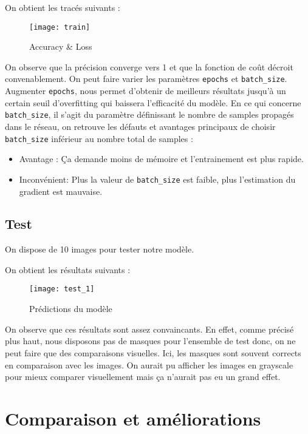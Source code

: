 \documentclass[12pt,a4paper,titlepage]{article}
\begin{document}
On obtient les tracés suivants :

\begin{figure}[H]
    \caption{Accuracy \& Loss}
    \texttt{[image: train]}
    \centering
\end{figure}

On observe que la précision converge vers 1 et que la fonction de coût décroit convenablement.
On peut faire varier les paramètres \texttt{epochs} et \texttt{batch\_size}. Augmenter \texttt{epochs},
nous permet d'obtenir de meilleurs résultats jusqu'à un certain seuil d'overfitting qui
baissera l'efficacité du modèle. En ce qui concerne \texttt{batch\_size}, il s'agit du
paramètre définissant le nombre de samples propagés dans le réseau, on retrouve les défauts
et avantages principaux de choisir \texttt{batch\_size} inférieur au nombre total de samples :

\begin{itemize}
    \item{Avantage : Ça demande moins de mémoire et l'entrainement est plus rapide.}
    \item{Inconvénient: Plus la valeur de \texttt{batch\_size} est faible, plus l'estimation
        du gradient est mauvaise.}
\end{itemize}

\subsection{Test}

On dispose de 10 images pour tester notre modèle.

On obtient les résultats suivants :

\begin{figure}[H]
    \caption{Prédictions du modèle}
    \texttt{[image: test\_1]}
    \centering
\end{figure}

On observe que ces résultats sont assez convaincants. En effet, comme précisé plus haut,
nous disposons pas de masques pour l'ensemble de test donc, on ne peut faire que des
comparaisons visuelles. Ici, les masques sont souvent corrects en comparaison avec les
images. On aurait pu afficher les images en grayscale pour mieux comparer visuellement
mais ça n'aurait pas eu un grand effet.

\section{Comparaison et améliorations}
\end{document}
